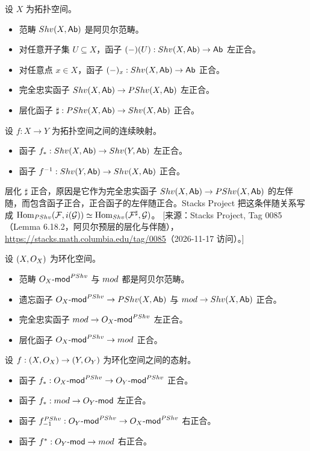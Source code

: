 \begin{proposition}\label{prop:A.5.2}
设 $X$ 为拓扑空间。
\begin{itemize}[leftmargin=2em,itemsep=0.25ex]
  \item 范畴 $Shv(X,\mathsf{Ab})$ 是阿贝尔范畴。
  \item 对任意开子集 $U\subseteq X$，函子 $(-)(U):Shv(X,\mathsf{Ab})\to\mathsf{Ab}$ 左正合。
  \item 对任意点 $x\in X$，函子 $(-)_x:Shv(X,\mathsf{Ab})\to\mathsf{Ab}$ 正合。
  \item 完全忠实函子 $Shv(X,\mathsf{Ab})\to PShv(X,\mathsf{Ab})$ 左正合。
  \item 层化函子 $\sharp:PShv(X,\mathsf{Ab})\to Shv(X,\mathsf{Ab})$ 正合。
\end{itemize}
设 $f:X\to Y$ 为拓扑空间之间的连续映射。
\begin{itemize}[leftmargin=2em,itemsep=0.25ex]
  \item 函子 $f_*:Shv(X,\mathsf{Ab})\to Shv(Y,\mathsf{Ab})$ 左正合。
  \item 函子 $f^{-1}:Shv(Y,\mathsf{Ab})\to Shv(X,\mathsf{Ab})$ 正合。
\end{itemize}
\end{proposition}

\begin{yizhu}
层化 $\sharp$ 正合，原因是它作为完全忠实函子 $Shv(X,\mathsf{Ab})\to PShv(X,\mathsf{Ab})$ 的左伴随，而包含函子正合，正合函子的左伴随正合。Stacks Project 把这条伴随关系写成 $\operatorname{Hom}_{PShv}(\mathcal{F},i(\mathcal{G}))\simeq\operatorname{Hom}_{Shv}(\mathcal{F}^{\sharp},\mathcal{G})$。
[来源：Stacks Project, Tag 0085（Lemma 6.18.2，阿贝尔预层的层化与伴随），\url{https://stacks.math.columbia.edu/tag/0085}（2026-11-17 访问）。]
\end{yizhu}

\begin{proposition}\label{prop:A.5.3}
设 $(X,O_X)$ 为环化空间。
\begin{itemize}[leftmargin=2em,itemsep=0.25ex]
  \item 范畴 $O_X\text{-}\mathsf{mod}^{PShv}$ 与 $mod$ 都是阿贝尔范畴。
  \item 遗忘函子 $O_X\text{-}\mathsf{mod}^{PShv}\to PShv(X,\mathsf{Ab})$ 与 $mod\to Shv(X,\mathsf{Ab})$ 正合。
  \item 完全忠实函子 $mod\to O_X\text{-}\mathsf{mod}^{PShv}$ 左正合。
  \item 层化函子 $O_X\text{-}\mathsf{mod}^{PShv}\to mod$ 正合。
\end{itemize}
设 $f:(X,O_X)\to(Y,O_Y)$ 为环化空间之间的态射。
\begin{itemize}[leftmargin=2em,itemsep=0.25ex]
  \item 函子 $f_*:O_X\text{-}\mathsf{mod}^{PShv}\to O_Y\text{-}\mathsf{mod}^{PShv}$ 正合。
  \item 函子 $f_*:mod\to O_Y\text{-}\mathsf{mod}$ 左正合。
  \item 函子 $f^{PShv}_{-1}:O_Y\text{-}\mathsf{mod}^{PShv}\to O_X\text{-}\mathsf{mod}^{PShv}$ 右正合。
  \item 函子 $f^*:O_Y\text{-}\mathsf{mod}\to mod$ 右正合。
\end{itemize}
\end{proposition}

